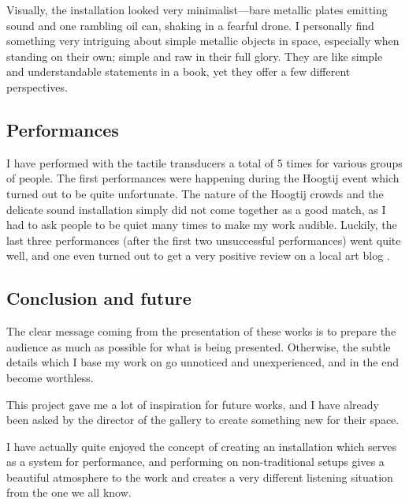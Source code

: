 \documentclass[12pt,a4paper,oneside]{report}
\begin{document}
Visually, the installation looked very minimalist---bare metallic plates emitting sound and one rambling oil can, shaking in a fearful drone. I personally find something very intriguing about simple metallic objects in space, especially when standing on their own; simple and raw in their full glory. They are like simple and understandable statements in a book, yet they offer a few different perspectives.

\subsection{Performances}

I have performed with the tactile transducers a total of 5 times for various groups of people. The first performances were happening during the Hoogtij event which turned out to be quite unfortunate. The nature of the Hoogtij crowds and the delicate sound installation simply did not come together as a good match, as I had to ask people to be quiet many times to make my work audible. Luckily, the last three performances (after the first two unsuccessful performances) went quite well, and one even turned out to get a very positive review on a local art blog \cite{jegen}.

\subsection{Conclusion and future}

The clear message coming from the presentation of these works is to prepare the audience as much as possible for what is being presented. Otherwise, the subtle details which I base my work on go unnoticed and unexperienced, and in the end become worthless.

This project gave me a lot of inspiration for future works, and I have already been asked by the director of the gallery to create something new for their space.

I have actually quite enjoyed the concept of creating an installation which serves as a system for performance, and performing on non-traditional setups gives a beautiful atmosphere to the work and creates a very different listening situation from the one we all know. 
\end{document}
